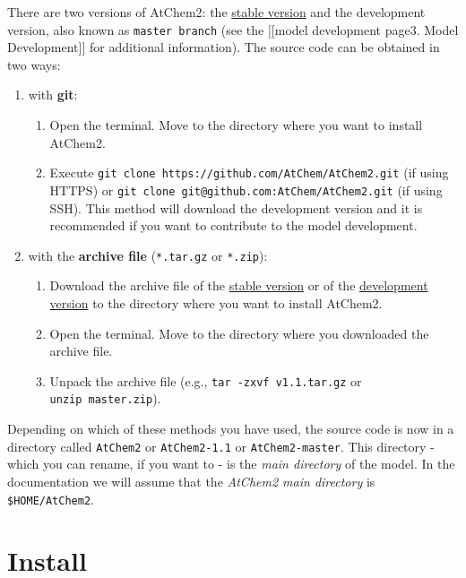 There are two versions of AtChem2: the
\href{https://github.com/AtChem/AtChem2/releases}{stable version} and
the development version, also known as \texttt{master\ branch} (see
the {[}{[}model development page\textbar{}3. Model Development{]}{]}
for additional information). The source code can be obtained in two
ways:

\begin{enumerate}
\item with \textbf{git}:
  \begin{enumerate}
  \item Open the terminal. Move to the directory where you want to
    install AtChem2.
  \item Execute \texttt{git\ clone\
      https://github.com/AtChem/AtChem2.git} (if using HTTPS) or
    \texttt{git\ clone\ git@github.com:AtChem/AtChem2.git} (if using
    SSH). This method will download the development version and it is
    recommended if you want to contribute to the model development.
  \end{enumerate}

\item with the \textbf{archive file} (\texttt{*.tar.gz} or
  \texttt{*.zip}):
  \begin{enumerate}
  \item Download the archive file of the
    \href{https://github.com/AtChem/AtChem2/releases}{stable version}
    or of the
    \href{https://github.com/AtChem/AtChem2/archive/master.zip}{development
      version} to the directory where you want to install AtChem2.
  \item Open the terminal. Move to the directory where you downloaded
    the archive file.
  \item Unpack the archive file (e.g., \texttt{tar\ -zxvf\
      v1.1.tar.gz} or \texttt{unzip\ master.zip}).
  \end{enumerate}
\end{enumerate}

Depending on which of these methods you have used, the source code is
now in a directory called \texttt{AtChem2} or \texttt{AtChem2-1.1} or
\texttt{AtChem2-master}. This directory - which you can rename, if you
want to - is the \emph{main directory} of the model. In the
documentation we will assume that the \emph{AtChem2 main directory} is
\texttt{\$HOME/AtChem2}.

\section{Install} \label{sec:install}

